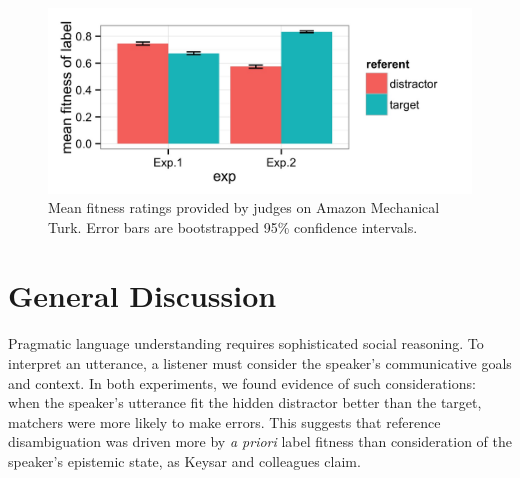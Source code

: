 \documentclass[10pt,letterpaper]{article}
\begin{document}
\begin{figure}[t!]
\begin{center}
\includegraphics[scale=.18]{images/fitnessInteraction.jpeg}
\caption{Mean fitness ratings provided by judges on Amazon Mechanical Turk. Error bars are bootstrapped 95\% confidence intervals.}
\label{fig:fitnessInteraction}
\end{center}
\end{figure}


\section{General Discussion}

Pragmatic language understanding requires sophisticated social reasoning. To interpret an utterance, a listener must consider the speaker's communicative goals and context. In both experiments, we found evidence of such considerations: when the speaker's utterance fit the hidden distractor better than the target, matchers were more likely to make errors. This suggests that reference disambiguation was driven more by \emph{a priori} label fitness than consideration of the speaker's epistemic state, as Keysar and colleagues claim. 
\end{document}
